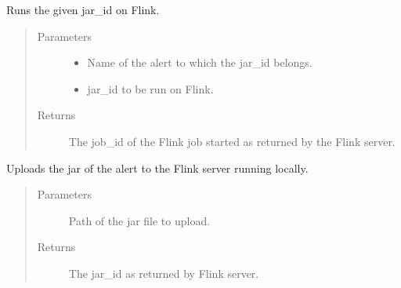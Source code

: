 \documentclass[letterpaper,10pt,english]{sphinxmanual}
\begin{document}
\begin{fulllineitems}
\begin{fulllineitems}
\begin{quote}
\begin{description}
\end{description}\end{quote}

\end{fulllineitems}


\begin{fulllineitems}
\label{\detokenize{flink:flink_api.FlinkAPI.run_jar}}
Runs the given jar\_id on Flink.
\begin{quote}\begin{description}
\item[{Parameters}] \leavevmode\begin{itemize}
\item {} 
 \textendash{} Name of the alert to which the jar\_id belongs.

\item {} 
 \textendash{} jar\_id to be run on Flink.

\end{itemize}

\item[{Returns}] \leavevmode
The job\_id of the Flink job started as returned by the Flink server.

\end{description}\end{quote}

\end{fulllineitems}


\begin{fulllineitems}
\label{\detokenize{flink:flink_api.FlinkAPI.upload_jar}}
Uploads the jar of the alert to the Flink server running locally.
\begin{quote}\begin{description}
\item[{Parameters}] \leavevmode
{} \textendash{} Path of the jar file to upload.

\item[{Returns}] \leavevmode
The jar\_id as returned by Flink server.

\end{description}\end{quote}

\end{fulllineitems}


\end{fulllineitems}
\end{document}
